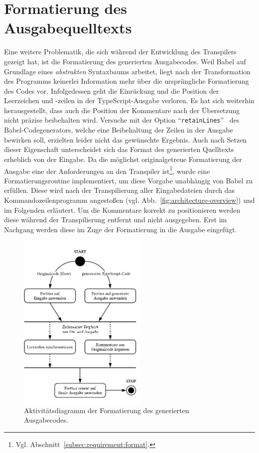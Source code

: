 {\section{Formatierung des Ausgabequelltexts}
\label{sec:formatting}

Eine weitere Problematik, die sich während der Entwicklung des Transpilers gezeigt hat, ist die Formatierung des generierten Ausgabecodes. Weil Babel auf Grundlage eines \emph{abstrakten} Syntaxbaums arbeitet, liegt nach der Transformation des Programms keinerlei Information mehr über die ursprüngliche Formatierung des Codes vor. Infolgedessen geht die Einrückung und die Position der Leerzeichen und -zeilen in der TypeScript-Ausgabe verloren. Es hat sich weiterhin herausgestellt, dass auch die Position der Kommentare nach der Übersetzung nicht präzise beibehalten wird. Versuche mit der Option \enquote{\texttt{retainLines}}~\autocite{BABEL:GENERATOR} des Babel-Codegenerators, welche eine Beibehaltung der Zeilen in der Ausgabe bewirken soll, erzielten leider nicht das gewünschte Ergebnis. Auch nach Setzen dieser Eigenschaft unterscheidet sich das Format des generierten Quelltexts erheblich von der Eingabe. Da die möglichst originalgetreue Formatierung der Ausgabe eine der Anforderungen an den Transpiler ist\footnote{Vgl. Abschnitt~\ref{subsec:requirement:format}.}, wurde eine Formatierungsroutine implementiert, um diese Vorgabe unabhängig von Babel zu erfüllen. Diese wird nach der Transpilierung aller Eingabedateien durch das Kommandozeilenprogramm angestoßen (vgl. Abb.~\ref{fig:architecture-overview}) und im Folgenden erläutert. Um die Kommentare korrekt zu positionieren werden diese während der Transpilierung entfernt und nicht ausgegeben. Erst im Nachgang werden diese im Zuge der Formatierung in die Ausgabe eingefügt.

\begin{figure}[htb]
  \centering
  \includegraphics[width=0.55\textwidth]{src/4_Umsetzung/fig/activity-diagram-formatting.pdf}
  \caption[Aktivitätsdiagramm der Formatierung des Ausgabecodes]{Aktivitätsdiagramm der Formatierung des generierten Ausgabecodes.}
  \label{fig:activity-diagram-formatting}
\end{figure}

}
